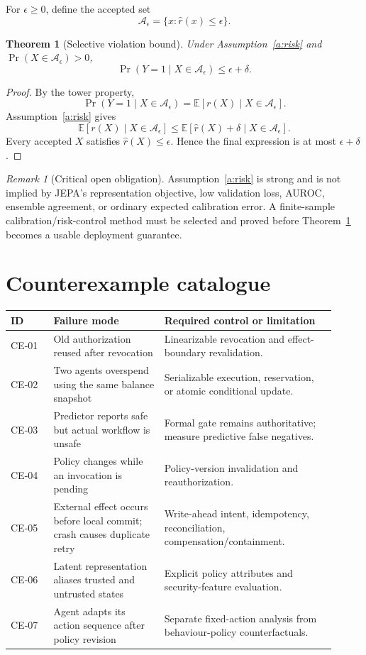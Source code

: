 \documentclass[11pt,a4paper]{article}
\newtheorem{theorem}{Theorem}[section]
\theoremstyle{remark}
\newtheorem{remark}{Remark}[section]
\newcommand{\E}{\mathbb{E}}
\begin{document}
For $\epsilon\geq0$, define the accepted set
\[
\mathcal A_\epsilon=\{x:\widehat r(x)\leq\epsilon\}.
\]

\begin{theorem}[Selective violation bound]\label{thm:selective}
Under Assumption~\ref{a:risk} and $\Pr(X\in\mathcal A_\epsilon)>0$,
\[
\Pr(Y=1\mid X\in\mathcal A_\epsilon)
\leq\epsilon+\delta.
\]
\end{theorem}

\begin{proof}
By the tower property,
\[
\Pr(Y=1\mid X\in\mathcal A_\epsilon)
=\E[r(X)\mid X\in\mathcal A_\epsilon].
\]
Assumption~\ref{a:risk} gives
\[
\E[r(X)\mid X\in\mathcal A_\epsilon]
\leq
\E[\widehat r(X)+\delta\mid X\in\mathcal A_\epsilon].
\]
Every accepted $X$ satisfies $\widehat r(X)\leq\epsilon$. Hence the final expression is at most $\epsilon+\delta$.
\end{proof}

\begin{remark}[Critical open obligation]
Assumption~\ref{a:risk} is strong and is not implied by JEPA's representation objective, low validation loss, AUROC, ensemble agreement, or ordinary expected calibration error. A finite-sample calibration/risk-control method must be selected and proved before Theorem~\ref{thm:selective} becomes a usable deployment guarantee.
\end{remark}

\section{Counterexample catalogue}

\begin{longtable}{p{0.12\linewidth}p{0.31\linewidth}p{0.48\linewidth}}
\toprule
ID & Failure mode & Required control or limitation\\
\midrule
CE-01 & Old authorization reused after revocation & Linearizable revocation and effect-boundary revalidation.\\
CE-02 & Two agents overspend using the same balance snapshot & Serializable execution, reservation, or atomic conditional update.\\
CE-03 & Predictor reports safe but actual workflow is unsafe & Formal gate remains authoritative; measure predictive false negatives.\\
CE-04 & Policy changes while an invocation is pending & Policy-version invalidation and reauthorization.\\
CE-05 & External effect occurs before local commit; crash causes duplicate retry & Write-ahead intent, idempotency, reconciliation, compensation/containment.\\
CE-06 & Latent representation aliases trusted and untrusted states & Explicit policy attributes and security-feature evaluation.\\
CE-07 & Agent adapts its action sequence after policy revision & Separate fixed-action analysis from behaviour-policy counterfactuals.\\
\bottomrule
\end{longtable}
\end{document}
